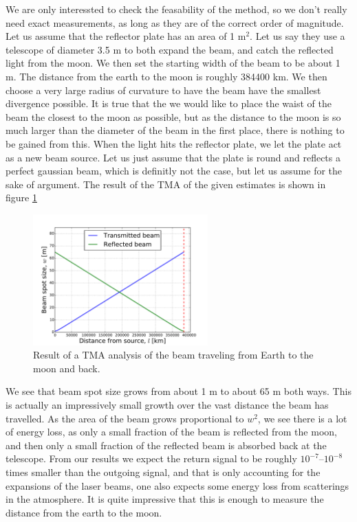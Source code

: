 \documentclass[a4paper, 11pt, notitlepage, english]{article}
\begin{document}
We are only interessted to check the feasability of the method, so we don't really need exact measurements, as long as they are of the correct order of magnitude. Let us assume that the reflector plate has an area of 1 m$^2$. Let us say they use a telescope of diameter 3.5 m to both expand the beam, and catch the reflected light from the moon. We then set the starting width of the beam to be about 1 m. The distance from the earth to the moon is roughly 384400 km. We then choose a very large radius of curvature to have the beam have the smallest divergence possible. It is true that the we would like to place the waist of the beam the closest to the moon as possible, but as the distance to the moon is so much larger than the diameter of the beam in the first place, there is nothing to be gained from this. When the light hits the reflector plate, we let the plate act as a new beam source. Let us just assume that the plate is round and reflects a perfect gaussian beam, which is definitly not the case, but let us assume for the sake of argument. The result of the TMA of the given estimates is shown in figure \ref{fig:moonTMA}

\begin{figure}[htbp]
\centering
\includegraphics[width=0.6\textwidth]{moon_beams}  
\caption{Result of a TMA analysis of the beam traveling from Earth to the moon and back. \label{fig:moonTMA}}
\end{figure}

We see that beam spot size grows from about 1 m to about 65 m both ways. This is actually an impressively small growth over the vast distance the beam has travelled. As the area of the beam grows proportional to $w^2$, we see there is a lot of energy loss, as only a small fraction of the beam is reflected from the moon, and then only a small fraction of the reflected beam is absorbed back at the telescope. From our results we expect the return signal to be roughly $10^{-7}$--$10^{-8}$ times smaller than the outgoing signal, and that is only accounting for the expansions of the laser beams, one also expects some energy loss from scatterings in the atmosphere. It is quite impressive that this is enough to measure the distance from the earth to the moon.
\end{document}
